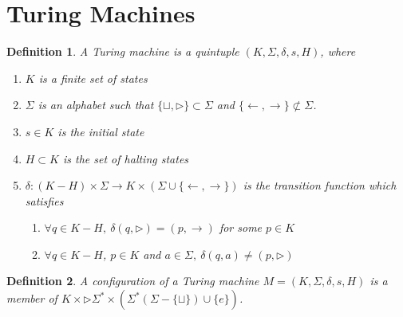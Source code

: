 \documentclass[aps,pra,onecolumn,notitlepage,superscriptaddress]{revtex4-1}
\newtheorem{defi}{Definition}
\begin{document}
    \section{Turing Machines}
    \begin{defi}
        A Turing machine is a quintuple $(K, \Sigma, \delta, s, H)$, where
        \begin{enumerate}
            \item $K$ is a finite set of states
            \item $\Sigma$ is an alphabet such that $\{ \sqcup, \rhd \} \subset \Sigma$ and $\{\leftarrow, \rightarrow\} \not\subset \Sigma$.
            \item $s \in K$ is the initial state
            \item $H \subset K$ is the set of halting states
            \item $\delta : (K-H) \times \Sigma \to K \times (\Sigma \cup \{ \leftarrow, \rightarrow \})$ is the transition function which satisfies
            \begin{enumerate}
                \item $\forall q \in K-H, \ \delta(q,\rhd) = (p, \rightarrow)$ for some $p \in K$
                \item $\forall q \in K-H$, $p \in K$ and $a \in \Sigma, \ \delta(q,a) \neq (p, \rhd)$
            \end{enumerate}
        \end{enumerate}
    \end{defi}

    \begin{defi}
        A configuration of a Turing machine $M = (K, \Sigma, \delta, s, H)$ is a member of $K \times \rhd \Sigma^* \times ( \Sigma^* (\Sigma - \{ \sqcup \}) \cup \{ e \} )$.
    \end{defi}
\end{document}
